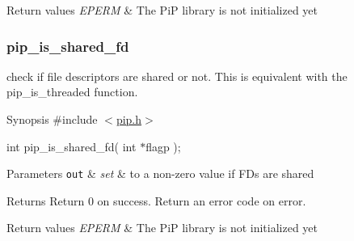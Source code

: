 \begin{DoxyRetVals}{Return values}
{\em E\-P\-E\-R\-M} & The Pi\-P library is not initialized yet \\
\hline
\end{DoxyRetVals}
\hypertarget{pip_is_shared_fd}{}\subsubsection{pip\-\_\-is\-\_\-shared\-\_\-fd}\label{pip_is_shared_fd}
check if file descriptors are shared or not. This is equivalent with the {\ttfamily pip\-\_\-is\-\_\-threaded} function.

\begin{DoxyParagraph}{Synopsis}
\#include $<$\hyperlink{pip_8h_source}{pip.\-h}$>$ \par
int pip\-\_\-is\-\_\-shared\-\_\-fd( int $\ast$flagp );
\end{DoxyParagraph}

\begin{DoxyParams}[1]{Parameters}
\mbox{\tt out}  & {\em set} & to a non-\/zero value if F\-Ds are shared\\
\hline
\end{DoxyParams}
\begin{DoxyReturn}{Returns}
Return 0 on success. Return an error code on error. 
\end{DoxyReturn}

\begin{DoxyRetVals}{Return values}
{\em E\-P\-E\-R\-M} & The Pi\-P library is not initialized yet \\
\hline
\end{DoxyRetVals}
